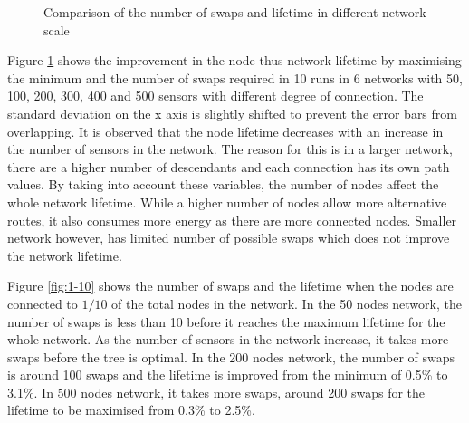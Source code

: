 \begin{figure}
\centering
\caption{Comparison of the number of swaps and lifetime in different network scale}
\label{fig:maxmin}
\end{figure}


Figure \ref{fig:maxmin} shows the improvement in the node thus network lifetime by maximising the minimum and the number of swaps required in 10 runs in 6 networks with 50, 100, 200, 300, 400 and 500 sensors with different degree of connection. 
The standard deviation on the x axis is slightly shifted to prevent the error bars from overlapping.
It is observed that the node lifetime decreases with an increase in the number of sensors in the network. The reason for this is in a larger network, there are a higher number of descendants and each connection has its own path values. By taking into account these variables, the number of nodes affect the whole network lifetime. While a higher number of nodes allow more alternative routes, it also consumes more energy as there are more connected nodes. Smaller network however, has limited number of possible swaps which does not improve the network lifetime.

Figure \ref{fig:1-10} shows the number of swaps and the lifetime when the nodes are connected to $1/10$ of the total nodes in the network. 
In the 50 nodes network, the number of swaps is less than 10 before it reaches the maximum lifetime for the whole network. 
As the number of sensors in the network increase, it takes more swaps before the tree is optimal. 
In the 200 nodes network, the number of swaps is around 100 swaps and the lifetime is improved from the minimum of 0.5\% to 3.1\%. In 500 nodes network, it takes more swaps, around 200 swaps for the lifetime to be maximised from 0.3\% to 2.5\%. 

